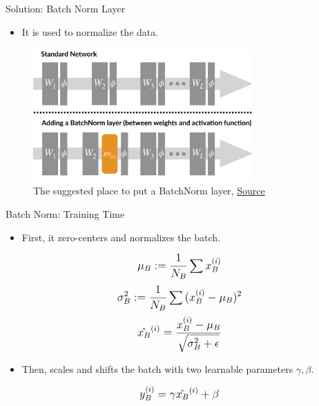 \documentclass[compress,oilve,t]{beamer}
\newcommand{\tc}[2]{
	\textcolor{#1}{\hspace{-2pt}#2\hspace{-2pt}}
}
\begin{document}
\begin{frame}{Solution: Batch Norm Layer}
	\begin{itemize}
		\item It is used to \tc{keywords}{normalize} the data.
	\end{itemize}
	\begin{figure}[H]
		\centering
		\includegraphics[width=0.75\textwidth]{Figs/section_4/batchnorm_2.jpg}
		\caption{The suggested place to put a BatchNorm layer, \href{https://gradientscience.org/batchnorm/}{Source}}
	\end{figure}
\end{frame}
\begin{frame}{Batch Norm: Training Time}
	\begin{itemize}
		\item First, it zero-centers and normalizes the batch.
	\end{itemize}
	\vspace{0.05\textheight}
	\begin{equation*}
		\mathlarger{
			\mu_B := \frac{1}{N_B} \sum{x_B^{(i)}}
		}
	\end{equation*}
	\begin{equation*}
		\mathlarger{
			\sigma_B^2 := \frac{1}{N_B} \sum{(x_B^{(i)} - \mu_B)^2}
		}
	\end{equation*}
	\begin{equation*}
		\mathlarger{
			\hat{x_B}^{(i)} = \frac{x_B^{(i)} - \mu_B}{\sqrt{\sigma^2_B + \epsilon}}
		}
	\end{equation*}
	\begin{itemize}
		\item Then, scales and shifts the batch with two learnable parameters $\gamma, \beta$.
	\end{itemize}
	\vspace{0.05\textheight}
	\begin{equation*}
		\mathlarger{
			y_B^{(i)} = \gamma \hat{x_B}^{(i)} + \beta	
		}
	\end{equation*}
\end{frame}
\end{document}
